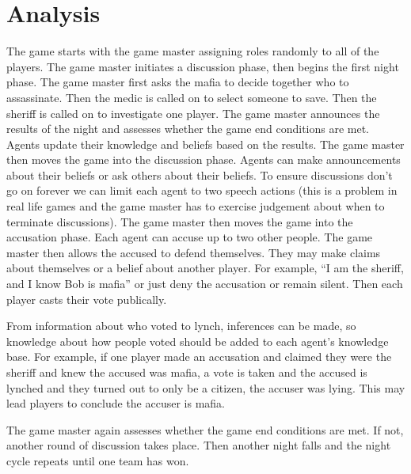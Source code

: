 \documentclass[12pt]{article} %
\begin{document}

\section{Analysis}

The game starts with the game master assigning roles randomly to all of the players. The game master initiates a discussion phase, then begins the first night phase. The game master first asks the mafia to decide together who to assassinate. Then the medic is called on to select someone to save. Then the sheriff is called on to investigate one player. The game master announces the results of the night and assesses whether the game end conditions are met. Agents update their knowledge and beliefs based on the results. The game master then moves the game into the discussion phase. Agents can make announcements about their beliefs or ask others about their beliefs. To ensure discussions don’t go on forever we can limit each agent to two speech actions (this is a problem in real life games and the game master has to exercise judgement about when to terminate discussions). The game master then moves the game into the accusation phase. Each agent can accuse up to two other people. The game master then allows the accused to defend themselves. They may make claims about themselves or a belief about another player. For example, “I am the sheriff, and I know Bob is mafia” or just deny the accusation or remain silent. Then each player casts their vote publically. 

From information about who voted to lynch, inferences can be made, so knowledge about how people voted should be added to each agent’s knowledge base. For example, if one player made an accusation and claimed they were the sheriff and knew the accused was mafia, a vote is taken and the accused is lynched and they turned out to only be a citizen, the accuser was lying. This may lead players to conclude the accuser is mafia. 

The game master again assesses whether the game end conditions are met. If not, another round of discussion takes place. Then another night falls and the night cycle repeats until one team has won.

\end{document}
